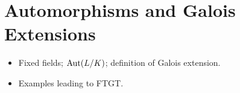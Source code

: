 \section{Automorphisms and Galois Extensions}
\begin{itemize}
  \item Fixed fields; $\mathrm{Aut}(L/K)$; definition of Galois extension.
  \item Examples leading to FTGT.
\end{itemize}
